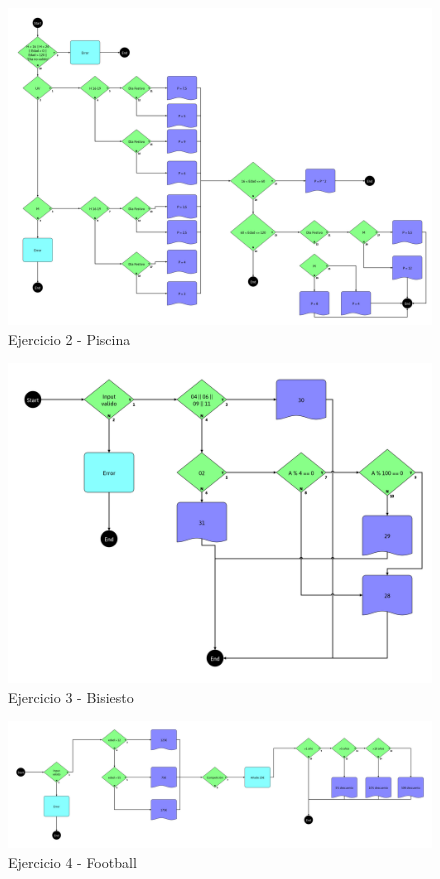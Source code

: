 \begin{figure}[htbp]
    \centering
    \includegraphics[width=0.95\columnwidth]{images/Piscina.png}
    \caption{Ejercicio 2 - Piscina}
    \label{fig:Piscina}
\end{figure}

\begin{figure}[htbp]
    \centering
    \includegraphics[width=0.95\columnwidth]{images/Bisiesto.png}
    \caption{Ejercicio 3 - Bisiesto}
    \label{fig:Bisiesto}
\end{figure}

\begin{figure}[htbp]
    \centering
    \includegraphics[width=0.95\columnwidth]{images/Football.png}
    \caption{Ejercicio 4 - Football}
    \label{fig:Football}
\end{figure}

